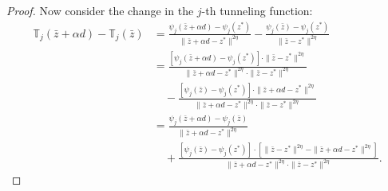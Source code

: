 \documentclass[10pt,a4paper]{amsart}
\newcommand{\obj}[1]{\psi_{#1}}               %
\newcommand{\tunobj}[1]{\mathbb{T}_{#1}}               %
\newcommand{\xlm}{z^*}                    %
\begin{document}
\begin{proof}
Now consider the change in the $j$-th tunneling function:
\begin{align*}
\tunobj{j}(\bar{z} + \alpha d) - \tunobj{j}(\bar{z}) 
&= \frac{\obj{j}(\bar{z} + \alpha d) - \obj{j}(\xlm)}{\| \bar{z} + \alpha d - \xlm \|^{2\eta}} 
    - \frac{\obj{j}(\bar{z}) - \obj{j}(\xlm)}{\| \bar{z} - \xlm \|^{2\eta}} \\
&= \frac{\left[ \obj{j}(\bar{z} + \alpha d) - \obj{j}(\xlm) \right] \cdot \|\bar{z} - \xlm\|^{2\eta} 
     }%
    {\| \bar{z} + \alpha d - \xlm \|^{2\eta} \cdot \| \bar{z} - \xlm \|^{2\eta}}\\
    &\quad-\frac{\left[\obj{j}(\bar{z}) - \obj{j}(\xlm)\right] \cdot \| \bar{z} + \alpha d - \xlm \|^{2\eta}}{\| \bar{z} + \alpha d - \xlm \|^{2\eta} \cdot \| \bar{z} - \xlm \|^{2\eta}} \\
&= \frac{\obj{j}(\bar{z} + \alpha d) - \obj{j}(\bar{z})}{\| \bar{z} + \alpha d - \xlm \|^{2\eta}} \\
&\quad + \frac{\left[\obj{j}(\bar{z}) - \obj{j}(\xlm)\right] \cdot 
     \left[ \| \bar{z} - \xlm \|^{2\eta} - \| \bar{z} + \alpha d - \xlm \|^{2\eta} \right]}%
    {\| \bar{z} + \alpha d - \xlm \|^{2\eta} \cdot \| \bar{z} - \xlm \|^{2\eta}}.
\end{align*}



\end{proof}
\end{document}
